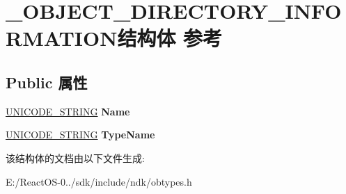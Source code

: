 \hypertarget{struct___o_b_j_e_c_t___d_i_r_e_c_t_o_r_y___i_n_f_o_r_m_a_t_i_o_n}{}\section{\+\_\+\+O\+B\+J\+E\+C\+T\+\_\+\+D\+I\+R\+E\+C\+T\+O\+R\+Y\+\_\+\+I\+N\+F\+O\+R\+M\+A\+T\+I\+O\+N结构体 参考}
\label{struct___o_b_j_e_c_t___d_i_r_e_c_t_o_r_y___i_n_f_o_r_m_a_t_i_o_n}
\subsection*{Public 属性}
\begin{DoxyCompactItemize}
\item 
\mbox{\label{struct___o_b_j_e_c_t___d_i_r_e_c_t_o_r_y___i_n_f_o_r_m_a_t_i_o_n_aedbb3ad58bcfa80ae2e04205c8968122}} 
\hyperlink{struct___u_n_i_c_o_d_e___s_t_r_i_n_g}{U\+N\+I\+C\+O\+D\+E\+\_\+\+S\+T\+R\+I\+NG} {\bfseries Name}
\item 
\mbox{\label{struct___o_b_j_e_c_t___d_i_r_e_c_t_o_r_y___i_n_f_o_r_m_a_t_i_o_n_a5078c257e0d449ca9c715f0d3137a66f}} 
\hyperlink{struct___u_n_i_c_o_d_e___s_t_r_i_n_g}{U\+N\+I\+C\+O\+D\+E\+\_\+\+S\+T\+R\+I\+NG} {\bfseries Type\+Name}
\end{DoxyCompactItemize}


该结构体的文档由以下文件生成\+:\begin{DoxyCompactItemize}
\item 
E\+:/\+React\+O\+S-\/0../sdk/include/ndk/obtypes.\+h\end{DoxyCompactItemize}
